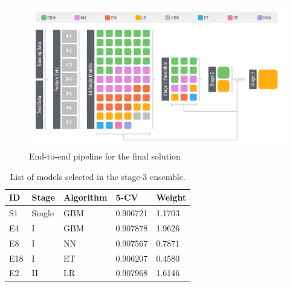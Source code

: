 \begin{figure}[!t]
  \caption{End-to-end pipeline for the final solution}
  \centering
    \includegraphics[width=1 \textwidth]{ensemble}
\end{figure}

\begin{table}
\begin{center}
\begin{tabular}{lllll}
ID 	& Stage 	& Algorithm 	& 5-CV 		& Weight\\ \hline
S1 	& Single	& GBM		& 0.906721 	& 1.1703 \\
E4 	& I 	& GBM		& 0.907878 	& 1.9626\\
E8 	& I 	& NN		& 0.907567	& 0.7871\\
E18	& I	& ET			& 0.906207 	& 0.4580\\
E2	& II & LR			& 0.907968 & 1.6146\\
\end{tabular}
\caption{List of models selected in the stage-3 ensemble.}
\label{tb:finalEnsemble}
\end{center}
\end{table}
